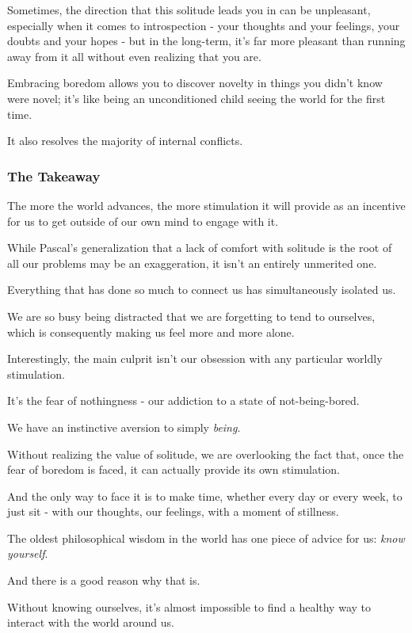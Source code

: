 \documentclass{article}
\begin{document}
%
Sometimes, the direction that this solitude leads you in can be unpleasant, especially when it comes to introspection - your thoughts and your feelings, your doubts and your hopes - but in the long-term, it's far more pleasant than running away from it all without even realizing that you are.

%
Embracing boredom allows you to discover novelty in things you didn't know were novel; it's like being an unconditioned child seeing the world for the first time.

It also resolves the majority of internal conflicts.

\subsubsection{The Takeaway}
The more the world advances, the more stimulation it will provide as an incentive for us to get outside of our own mind to engage with it.

%
While Pascal's generalization that a lack of comfort with solitude is the root of all our problems may be an exaggeration, it isn't an entirely unmerited one.

%
Everything that has done so much to connect us has simultaneously isolated us.

We are so busy being distracted that we are forgetting to tend to ourselves, which is consequently making us feel more and more alone.

%
Interestingly, the main culprit isn't our obsession with any particular worldly stimulation.

It's the fear of nothingness - our addiction to a state of not-being-bored.

We have an instinctive aversion to simply \textit{being}.

%
Without realizing the value of solitude, we are overlooking the fact that, once the fear of boredom is faced, it can actually provide its own stimulation.

And the only way to face it is to make time, whether every day or every week, to just sit - with our thoughts, our feelings, with a moment of stillness.

%
The oldest philosophical wisdom in the world has one piece of advice for us: \textit{know yourself}.

And there is a good reason why that is.

%
Without knowing ourselves, it's almost impossible to find a healthy way to interact with the world around us.
\end{document}
